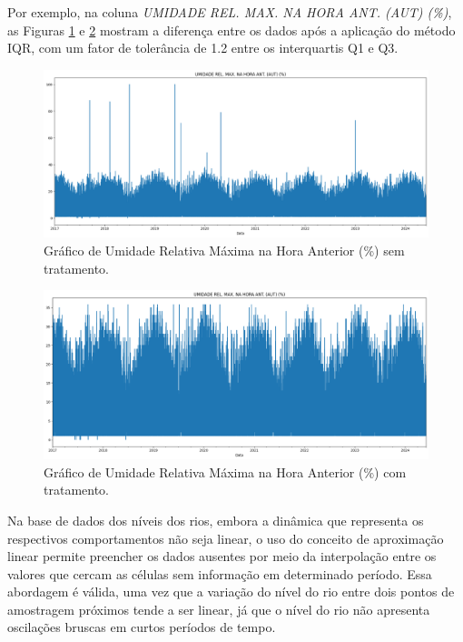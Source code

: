 Por exemplo, na coluna \textit{UMIDADE REL. MAX. NA HORA ANT. (AUT) (\%)}, as Figuras \ref{fig:dados_outlier_sem_tratamento} e \ref{fig:dados_outlier_com_tratamento} mostram a diferença entre os dados após a aplicação do método IQR, com um fator de tolerância de 1.2 entre os interquartis Q1 e Q3.

\begin{figure}[H]
	\caption{\label{fig:dados_outlier_sem_tratamento}Gráfico de Umidade Relativa Máxima  na Hora Anterior (\%) sem tratamento.}
	\begin{center}
		\includegraphics[scale=0.35]{figuras/UMIDADE REL. MAX. NA HORA ANT. (AUT) SEM TRATAMENTO.png}
	\end{center}
\end{figure}

\begin{figure}[H]
	\caption{\label{fig:dados_outlier_com_tratamento}Gráfico de Umidade Relativa Máxima  na Hora Anterior (\%) com tratamento.}
	\begin{center}
		\includegraphics[scale=0.35]{figuras/UMIDADE REL. MAX. NA HORA ANT. (AUT) COM TRATAMENTO.png}
	\end{center}
\end{figure}

Na base de dados dos níveis dos rios, embora a dinâmica que representa os respectivos comportamentos não seja linear, o uso do conceito de aproximação linear permite preencher os dados ausentes por meio da interpolação entre os valores que cercam as células sem informação em determinado período. Essa abordagem é válida, uma vez que a variação do nível do rio entre dois pontos de amostragem próximos tende a ser linear, já que o nível do rio não apresenta oscilações bruscas em curtos períodos de tempo.

